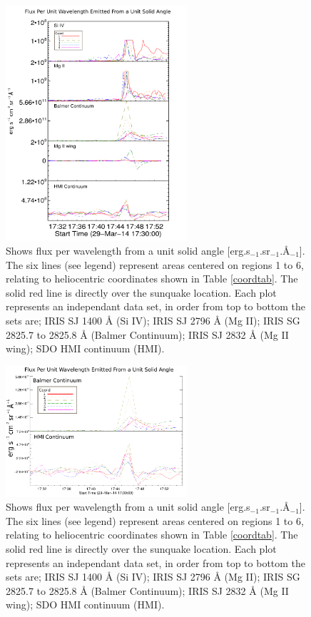 \begin{figure}[H]
  \begin{center}
  \includegraphics[width=0.6\textwidth]{29-Mar-14-Flux-Ladder}
  \end{center}
  \caption{Shows flux per wavelength from a unit solid angle [erg.s$_{-1}$.sr$_{-1}$.Å$_{-1}$]. The six lines (see legend) represent areas centered on regions 1 to 6, relating to heliocentric coordinates shown in Table \ref{coordtab}. The solid red line is directly over the sunquake location. Each plot represents an independant data set, in order from top to bottom the sets are; IRIS SJ 1400 Å (Si IV); IRIS SJ 2796 Å (Mg II); IRIS SG  2825.7 to 2825.8 Å (Balmer Continuum); IRIS SJ 2832 Å (Mg II wing); SDO HMI continuum (HMI).}\label{fluxladder}
\end{figure}

\begin{figure}[H]
  \begin{center}
  \includegraphics[width=0.6\textwidth]{29-Mar-14-Flux-Ladder-Balm-HMI-Only}
  \end{center}
  \caption{Shows flux per wavelength from a unit solid angle [erg.s$_{-1}$.sr$_{-1}$.Å$_{-1}$]. The six lines (see legend) represent areas centered on regions 1 to 6, relating to heliocentric coordinates shown in Table \ref{coordtab}. The solid red line is directly over the sunquake location. Each plot represents an independant data set, in order from top to bottom the sets are; IRIS SJ 1400 Å (Si IV); IRIS SJ 2796 Å (Mg II); IRIS SG  2825.7 to 2825.8 Å (Balmer Continuum); IRIS SJ 2832 Å (Mg II wing); SDO HMI continuum (HMI).}\label{fluxladder-balm-hmi-only}
\end{figure}


